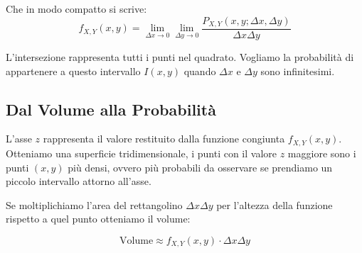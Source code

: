 Che in modo compatto si scrive:
\begin{equation}
f_{X,Y}(x,y) = \lim_{\Delta x \to 0} \lim_{\Delta y \to 0} \frac{P_{X,Y}(x,y; \Delta x, \Delta y)}{\Delta x \Delta y}
\end{equation}

L'intersezione rappresenta tutti i punti nel quadrato. Vogliamo la probabilità di appartenere a questo intervallo $I(x,y)$ quando $\Delta x$ e $\Delta y$ sono infinitesimi.

\subsection{Dal Volume alla Probabilità}

\begin{center}
\end{center}

L'asse $z$ rappresenta il valore restituito dalla funzione congiunta $f_{X,Y}(x,y)$. Otteniamo una superficie tridimensionale, i punti con il valore $z$ maggiore sono i punti $(x,y)$ più densi, ovvero più probabili da osservare se prendiamo un piccolo intervallo attorno all'asse.

Se moltiplichiamo l'area del rettangolino $\Delta x \Delta y$ per l'altezza della funzione rispetto a quel punto otteniamo il volume:

\begin{equation}
\text{Volume} \approx f_{X,Y}(x,y) \cdot \Delta x \Delta y
\end{equation}

